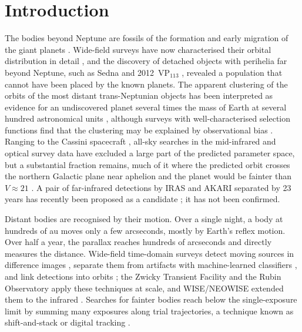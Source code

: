 \documentclass[twocolumn,linenumbers,anonymous]{aastex702}
\begin{document}
\section{Introduction}\label{sec:intro}

The bodies beyond Neptune are fossils of the formation and early migration of the giant planets \citep{gladman08}. Wide-field surveys have now characterised their orbital distribution in detail \citep{bannister18,bernardinelli20,bernardinelli22}, and the discovery of detached objects with perihelia far beyond Neptune, such as Sedna and 2012~VP$_{113}$ \citep{brown04,trujillo14}, revealed a population that cannot have been placed by the known planets. The apparent clustering of the orbits of the most distant trans-Neptunian objects \citep{trujillo14,sheppard16} has been interpreted as evidence for an undiscovered planet several times the mass of Earth at several hundred astronomical units \citep{batygin16,brown16,brown21,batygin19}, although surveys with well-characterised selection functions find that the clustering may be explained by observational bias \citep{shankman17,napier21}. Ranging to the Cassini spacecraft \citep{fienga16,holman16}, all-sky searches in the mid-infrared \citep{luhman14,meisner18} and optical survey data have excluded a large part of the predicted parameter space, but a substantial fraction remains, much of it where the predicted orbit crosses the northern Galactic plane near aphelion and the planet would be fainter than $V \approx 21$ \citep{brown24}. A pair of far-infrared detections by IRAS and AKARI separated by 23 years has recently been proposed as a candidate \citep{phan25}; it has not been confirmed.

Distant bodies are recognised by their motion. Over a single night, a body at hundreds of au moves only a few arcseconds, mostly by Earth's reflex motion. Over half a year, the parallax reaches hundreds of arcseconds and directly measures the distance. Wide-field time-domain surveys detect moving sources in difference images \citep{alard98,bramich08,zackay16,masci19}, separate them from artifacts with machine-learned classifiers \citep{bloom12,brink13,goldstein15,cabrera17,duev19}, and link detections into orbits \citep{kubica07,denneau13,holman18}; the Zwicky Transient Facility \citep{bellm19} and the Rubin Observatory \citep{ivezic19} apply these techniques at scale, and WISE/NEOWISE extended them to the infrared \citep{wright10,mainzer11}. Searches for fainter bodies reach below the single-exposure limit by summing many exposures along trial trajectories, a technique known as shift-and-stack or digital tracking \citep{gladman98,bernstein04,holman04,whidden19,smotherman21}.
\end{document}
